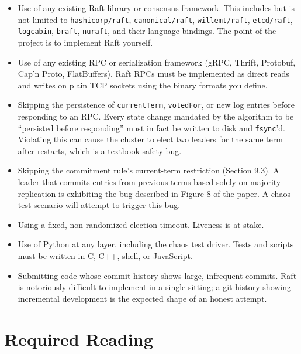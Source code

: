 \documentclass[11pt,a4paper]{article}
\begin{document}
\begin{notebox}
\begin{itemize}
\item Use of any existing Raft library or consensus framework. This includes but is not limited to \texttt{hashicorp/raft}, \texttt{canonical/raft}, \texttt{willemt/raft}, \texttt{etcd/raft}, \texttt{logcabin}, \texttt{braft}, \texttt{nuraft}, and their language bindings. The point of the project is to implement Raft yourself.

\item Use of any existing RPC or serialization framework (gRPC, Thrift, Protobuf, Cap'n Proto, FlatBuffers). Raft RPCs must be implemented as direct reads and writes on plain TCP sockets using the binary formats you define.

\item Skipping the persistence of \texttt{currentTerm}, \texttt{votedFor}, or new log entries before responding to an RPC. Every state change mandated by the algorithm to be ``persisted before responding'' must in fact be written to disk and \texttt{fsync}'d. Violating this can cause the cluster to elect two leaders for the same term after restarts, which is a textbook safety bug.

\item Skipping the commitment rule's current-term restriction (Section 9.3). A leader that commits entries from previous terms based solely on majority replication is exhibiting the bug described in Figure 8 of the paper. A chaos test scenario will attempt to trigger this bug.

\item Using a fixed, non-randomized election timeout. Liveness is at stake.

\item Use of Python at any layer, including the chaos test driver. Tests and scripts must be written in C, C++, shell, or JavaScript.

\item Submitting code whose commit history shows large, infrequent commits. Raft is notoriously difficult to implement in a single sitting; a git history showing incremental development is the expected shape of an honest attempt.
\end{itemize}
\end{notebox}

\section{Required Reading}
\end{document}
